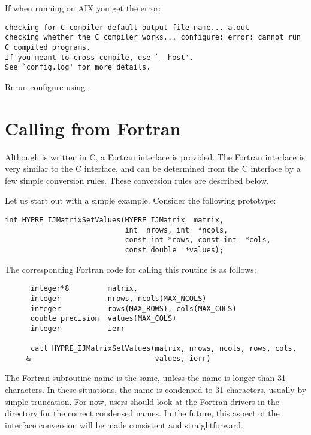 If when running  on AIX you get the error:
\begin{ttfamily}
\begin{mdseries}
\begin{verbatim}
checking for C compiler default output file name... a.out
checking whether the C compiler works... configure: error: cannot run C compiled programs.
If you meant to cross compile, use `--host'.
See `config.log' for more details.
\end{verbatim}
\end{mdseries}
\end{ttfamily}
Rerun configure using .


\section{Calling from Fortran}
\label{Calling from Fortran}

Although \hypre{} is written in C, a Fortran interface is provided.
The Fortran interface is very similar to the C interface, and can be
determined from the C interface by a few simple conversion rules.
These conversion rules are described below.

Let us start out with a simple example.  Consider the following
\hypre{} prototype:
\begin{display}
\begin{verbatim}
int HYPRE_IJMatrixSetValues(HYPRE_IJMatrix  matrix,
                            int  nrows, int  *ncols,
                            const int *rows, const int  *cols,
                            const double  *values);
\end{verbatim}
\end{display}
The corresponding Fortran code for calling this routine is as follows:
\begin{display}
\begin{verbatim}
      integer*8         matrix, 
      integer           nrows, ncols(MAX_NCOLS)
      integer           rows(MAX_ROWS), cols(MAX_COLS)
      double precision  values(MAX_COLS)
      integer           ierr

      call HYPRE_IJMatrixSetValues(matrix, nrows, ncols, rows, cols,
     &                             values, ierr)
\end{verbatim}
\end{display}
The Fortran subroutine name is the same, unless the name is longer
than 31 characters.  In these situations, the name is condensed to 31
characters, usually by simple truncation.  For now, users should look
at the Fortran drivers in the  directory for the correct
condensed names.  In the future, this aspect of the interface conversion
will be made consistent and straightforward.


